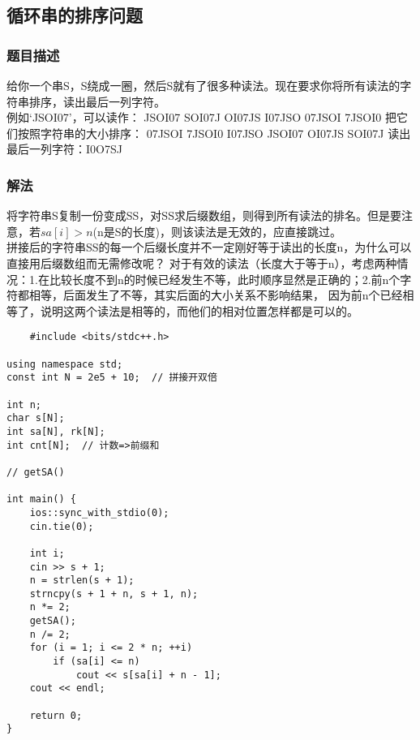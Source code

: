     \subsection{循环串的排序问题}
        \subsubsection{题目描述}
            给你一个串S，S绕成一圈，然后S就有了很多种读法。现在要求你将所有读法的字符串排序，读出最后一列字符。\\
            例如‘JSOI07’，可以读作： JSOI07 SOI07J OI07JS I07JSO 07JSOI 7JSOI0 把它们按照字符串的大小排序： 07JSOI 7JSOI0 I07JSO JSOI07 OI07JS SOI07J 读出最后一列字符：I0O7SJ
        \subsubsection{解法}
            将字符串S复制一份变成SS，对SS求后缀数组，则得到所有读法的排名。但是要注意，若$sa[i]>n$(n是S的长度)，则该读法是无效的，应直接跳过。\\
            拼接后的字符串SS的每一个后缀长度并不一定刚好等于读出的长度n，为什么可以直接用后缀数组而无需修改呢？
            对于有效的读法（长度大于等于n），考虑两种情况：1.在比较长度不到n的时候已经发生不等，此时顺序显然是正确的；2.前n个字符都相等，后面发生了不等，其实后面的大小关系不影响结果，
            因为前n个已经相等了，说明这两个读法是相等的，而他们的相对位置怎样都是可以的。
\begin{lstlisting}
    #include <bits/stdc++.h>

using namespace std;
const int N = 2e5 + 10;  // 拼接开双倍

int n;
char s[N];
int sa[N], rk[N];
int cnt[N];  // 计数=>前缀和

// getSA()

int main() {
    ios::sync_with_stdio(0);
    cin.tie(0);

    int i;
    cin >> s + 1;
    n = strlen(s + 1);
    strncpy(s + 1 + n, s + 1, n);
    n *= 2;
    getSA();
    n /= 2;
    for (i = 1; i <= 2 * n; ++i)
        if (sa[i] <= n)
            cout << s[sa[i] + n - 1];
    cout << endl;

    return 0;
}
\end{lstlisting}
